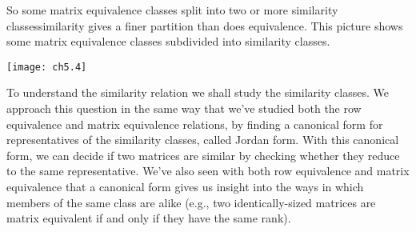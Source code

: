 So some matrix equivalence classes
split into two or more similarity classes\Dash similarity gives a finer
partition than does equivalence.
This picture shows some matrix equivalence classes subdivided into
similarity classes.
\begin{center}
  \texttt{[image: ch5.4]}
\end{center}

To understand the similarity relation we shall study the similarity classes.
We approach this question in the same way that we've studied both the
row equivalence and matrix equivalence relations, by finding
a canonical form for
representatives %
of the similarity classes, called Jordan form.
With this canonical form, we can decide if two matrices are similar by checking
whether they reduce to the same representative.
We've also seen with both row equivalence and matrix equivalence that a
canonical form gives us insight into the ways in which members of
the same class are alike
(e.g., two identically-sized matrices are matrix equivalent
if and only if they have the same rank).

